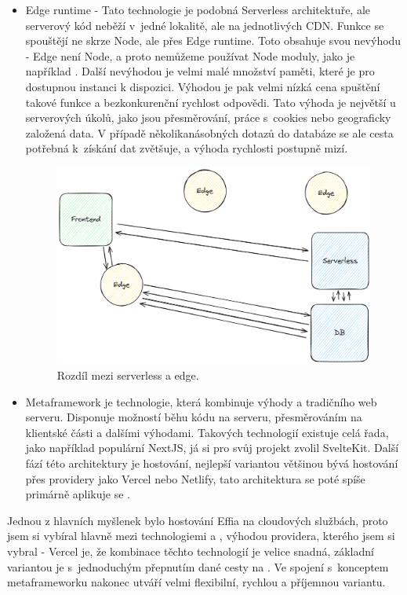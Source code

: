 \documentclass[12pt, a4paper,
openright
]{report}
\begin{document}
\begin{itemize}
\item Edge runtime - Tato technologie je podobná Serverless architektuře, ale serverový kód neběží v~jedné lokalitě, ale na jednotlivých CDN. Funkce se spouštějí ne skrze Node, ale přes Edge runtime. Toto obsahuje svou nevýhodu - Edge není Node, a proto nemůžeme používat Node moduly, jako je například . Další nevýhodou je velmi malé množství paměti, které je pro dostupnou instanci k dispozici. Výhodou je pak velmi nízká cena spuštění takové funkce a bezkonkurenční rychlost odpovědi. Tato výhoda je největší u serverových úkolů, jako jsou přesměrování, práce s~cookies nebo geograficky založená data. V případě několikanásobných dotazů do databáze se ale cesta potřebná k~získání dat zvětšuje, a výhoda rychlosti postupně mizí.

\begin{figure}[h!]
	\centering %
	\includegraphics[width=0.7\linewidth]{image/edge-serverless.png} 
	\caption{Rozdíl mezi serverless a edge.} %
	\label{fig:edge-serverless} %
\end{figure}

\item Metaframework je technologie, která kombinuje výhody  a tradičního web serveru. Disponuje možností běhu kódu na serveru, přesměrováním na klientské části a dalšími výhodami. Takových technologií existuje celá řada, jako například populární NextJS, já si pro svůj projekt zvolil SvelteKit. Další fází této architektury je hostování, nejlepší variantou většinou bývá hostování přes providery jako Vercel nebo Netlify, tato architektura se poté spíše primárně aplikuje se .
\end{itemize}

Jednou z hlavních myšlenek bylo hostování Effia na cloudových službách, proto jsem si vybíral hlavně mezi technologiemi  a , výhodou providera, kterého jsem si vybral - Vercel je, že kombinace těchto technologií je velice snadná, základní variantou je  s~jednoduchým přepnutím dané cesty na . Ve spojení s~konceptem metaframeworku nakonec utváří velmi flexibilní, rychlou a příjemnou variantu.
\end{document}
